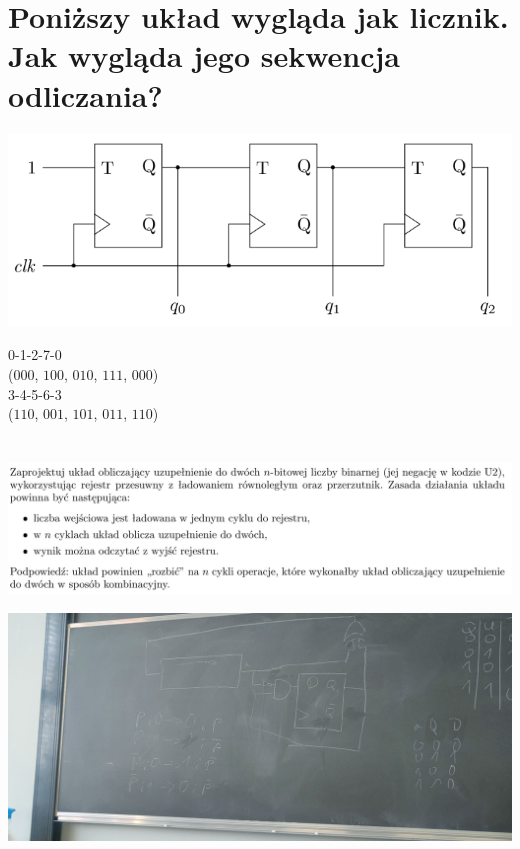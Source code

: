 \documentclass{article}
\begin{document}
\section{Poniższy układ wygląda jak licznik. Jak wygląda jego sekwencja odliczania?}
\begin{center}
\includegraphics[scale=0.4]{./L07Z03.png}
\end{center}
0-1-2-7-0\\ ($000$, $100$, $010$, $111$, $000$)\\
3-4-5-6-3\\ ($110$, $001$, $101$, $011$, $110$)\\

\section{}
\includegraphics[scale=0.3]{./L07Z04.png}
\begin{center}
\includegraphics[scale=0.05]{./L07Z04.jpg}
\end{center}
\end{document}
